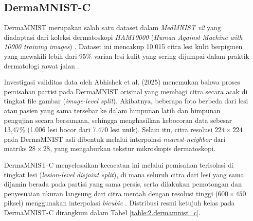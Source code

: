 \subsection{DermaMNIST-C} \label{II.Teori.DermaMNIST}
DermaMNIST merupakan salah satu dataset dalam \textit{MedMNIST v2} \cite{yang2023medmnist} yang diadaptasi dari koleksi dermatoskopi \textit{HAM10000} (\textit{Human Against Machine with 10000 training images}) \cite{tschandl2018ham10000}. Dataset ini mencakup 10.015 citra lesi kulit berpigmen yang mewakili lebih dari 95\% varian lesi kulit yang sering dijumpai dalam praktik dermatologi rawat jalan \cite{tschandl2018ham10000}. \par

Investigasi validitas data oleh Abhishek et al. (2025) \cite{abhishek2025investigating} menemukan bahwa proses pemisahan partisi pada DermaMNIST orisinal yang membagi citra secara acak di tingkat file gambar (\textit{image-level split}). Akibatnya, beberapa foto berbeda dari lesi atau pasien yang sama tersebar ke dalam himpunan latih dan himpunan pengujian secara bersamaan, sehingga menghasilkan kebocoran data sebesar 13,47\% (1.006 lesi bocor dari 7.470 lesi unik). Selain itu, citra resolusi $224 \times 224$ pada DermaMNIST asli dibentuk melalui interpolasi \textit{nearest-neighbor} dari matriks $28 \times 28$, yang mengaburkan tekstur mikroskopis dermatoskopi. \par

DermaMNIST-C menyelesaikan kecacatan ini melalui pemisahan terisolasi di tingkat lesi (\textit{lesion-level disjoint split}), di mana seluruh citra dari lesi yang sama dijamin berada pada partisi yang sama persis, serta dilakukan pemotongan dan penyesuaian ukuran langsung dari citra mentah dengan resolusi tinggi ($600 \times 450$ piksel) menggunakan interpolasi \textit{bicubic} \cite{abhishek2025investigating}. Distribusi resmi ketujuh kelas pada DermaMNIST-C dirangkum dalam Tabel \ref{table:2.dermamnist_c}. \par

